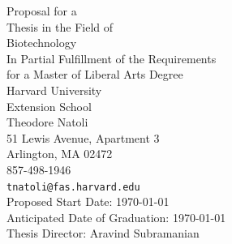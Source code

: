 \documentclass[12pt]{article}
\begin{document}

\begin{titlepage}
\begin{center}
Proposal for a\\
Thesis in the Field of\\
Biotechnology\\[\baselineskip]
In Partial Fulfillment of the Requirements\\
for a Master of Liberal Arts Degree\\[\baselineskip]
Harvard University\\
Extension School\\[\baselineskip]
Theodore Natoli\\
51 Lewis Avenue, Apartment 3\\
Arlington, MA 02472\\
857-498-1946\\
\texttt{tnatoli@fas.harvard.edu}\\[\baselineskip]
Proposed Start Date: \today\\
Anticipated Date of Graduation: \today\\
Thesis Director: Aravind Subramanian
\end{center}
\end{titlepage}
\end{document}
